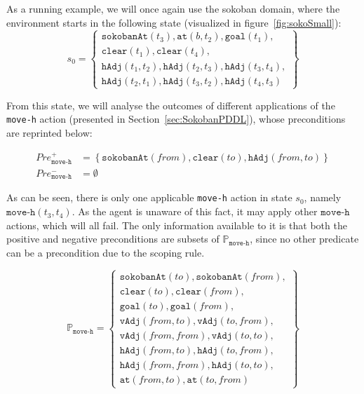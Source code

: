 \documentclass[../Master.tex]{subfiles}
\begin{document}
\begin{example}\label{ex:ncp:sokobanSetup}
    As a running example, we will once again use the sokoban domain, where the environment starts in the following state (visualized in figure~\ref{fig:sokoSmall}):
    \begin{equation*}
        s_0 =
        \left\{
            \begin{gathered}
                \texttt{sokobanAt}(t_3), \texttt{at}(b, t_2), \texttt{goal}(t_1), \\
                \texttt{clear}(t_1), \texttt{clear}(t_4), \\
                \texttt{hAdj}(t_1, t_2), \texttt{hAdj}(t_2, t_3),
                \texttt{hAdj}(t_3, t_4), \\
                \texttt{hAdj}(t_2, t_1), \texttt{hAdj}(t_3, t_2),
                \texttt{hAdj}(t_4, t_3)
            \end{gathered}
        \right\}
    \end{equation*}

    From this state, we will analyse the outcomes of different applications of the \texttt{move-h} action (presented in Section~\ref{sec:SokobanPDDL}), whose preconditions are reprinted below:

    \begin{align*}
        Pre_{\texttt{move-h}}^+ &= \left\{
            \texttt{sokobanAt}(from), \texttt{clear}(to), \texttt{hAdj}(from, to)
            \right\} \\
        Pre_{\texttt{move-h}}^- &= \emptyset
    \end{align*}

    As can be seen, there is only one applicable \texttt{move-h} action in state $s_0$, namely $\texttt{move-h}(t_3,t_4)$. As the agent is unaware of this fact, it may apply other $\texttt{move-h}$ actions, which will all fail. The only information available to it is that both the positive and negative preconditions are subsets of $\mathbb{P}_{\texttt{move-h}}$, since no other predicate can be a precondition due to the scoping rule.

    \begin{equation*}
    \mathbb{P}_{\texttt{move-h}} =
    \left\{
        \begin{gathered}
            \texttt{sokobanAt}(to), \texttt{sokobanAt}(from), \\
            \texttt{clear}(to), \texttt{clear}(from), \\
            \texttt{goal}(to), \texttt{goal}(from), \\
            \texttt{vAdj}(from, to), \texttt{vAdj}(to, from), \\
            \texttt{vAdj}(from, from), \texttt{vAdj}(to, to), \\
            \texttt{hAdj}(from, to), \texttt{hAdj}(to, from), \\
            \texttt{hAdj}(from, from), \texttt{hAdj}(to, to), \\
            \texttt{at}(from, to), \texttt{at}(to, from)
        \end{gathered}
    \right\}
    \end{equation*}
\end{example}
\end{document}
